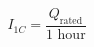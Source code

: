 \documentclass[preview]{standalone}
\begin{document}
\[I_{1C} = \frac{Q_\text{rated}}{1 \text{ hour}} \tag{3.5}\]
\end{document}
